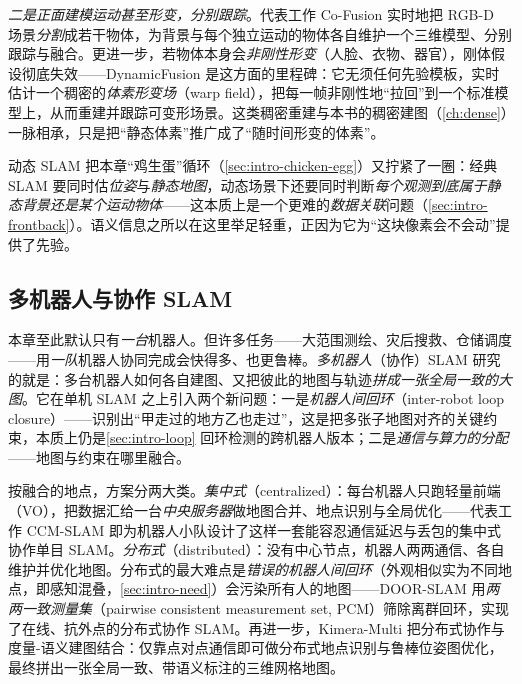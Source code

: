 \emph{二是正面建模运动甚至形变，分别跟踪}。代表工作 Co-Fusion\cite{runz2017cofusion} 实时地把 RGB-D 场景\emph{分割}成若干物体，为背景与每个独立运动的物体各自维护一个三维模型、分别跟踪与融合。更进一步，若物体本身会\emph{非刚性形变}（人脸、衣物、器官），刚体假设彻底失效——DynamicFusion\cite{newcombe2015dynamicfusion} 是这方面的里程碑：它无须任何先验模板，实时估计一个稠密的\emph{体素形变场}（warp field），把每一帧非刚性地“拉回”到一个标准模型上，从而重建并跟踪可变形场景。这类稠密重建与本书的稠密建图（\cref{ch:dense}）一脉相承，只是把“静态体素”推广成了“随时间形变的体素”。

\begin{insight}
动态 SLAM 把本章“鸡生蛋”循环（\cref{sec:intro-chicken-egg}）又拧紧了一圈：经典 SLAM 要同时估\emph{位姿}与\emph{静态地图}，动态场景下还要同时判断\emph{每个观测到底属于静态背景还是某个运动物体}——这本质上是一个更难的\emph{数据关联}问题（\cref{sec:intro-frontback}）。语义信息之所以在这里举足轻重，正因为它为“这块像素会不会动”提供了先验。
\end{insight}

\subsection{多机器人与协作 SLAM}
\label{sec:intro-multirobot}
本章至此默认只有\emph{一台}机器人。但许多任务——大范围测绘、灾后搜救、仓储调度——用\emph{一队}机器人协同完成会快得多、也更鲁棒。\emph{多机器人}（协作）SLAM 研究的就是：多台机器人如何各自建图、又把彼此的地图与轨迹\emph{拼成一张全局一致的大图}\cite{cadena2016past}。它在单机 SLAM 之上引入两个新问题：一是\emph{机器人间回环}（inter-robot loop closure）——识别出“甲走过的地方乙也走过”，这是把多张子地图对齐的关键约束，本质上仍是\cref{sec:intro-loop} 回环检测的跨机器人版本；二是\emph{通信与算力的分配}——地图与约束在哪里融合。

按融合的地点，方案分两大类。\emph{集中式}（centralized）：每台机器人只跑轻量前端（VO），把数据汇给一台\emph{中央服务器}做地图合并、地点识别与全局优化——代表工作 CCM-SLAM\cite{schmuck2019ccmslam} 即为机器人小队设计了这样一套能容忍通信延迟与丢包的集中式协作单目 SLAM。\emph{分布式}（distributed）：没有中心节点，机器人两两通信、各自维护并优化地图。分布式的最大难点是\emph{错误的机器人间回环}（外观相似实为不同地点，即感知混叠，\cref{sec:intro-need}）会污染所有人的地图——DOOR-SLAM\cite{lajoie2020doorslam} 用\emph{两两一致测量集}（pairwise consistent measurement set, PCM）筛除离群回环，实现了在线、抗外点的分布式协作 SLAM。再进一步，Kimera-Multi\cite{tian2022kimeramulti} 把分布式协作与度量-语义建图结合：仅靠点对点通信即可做分布式地点识别与鲁棒位姿图优化，最终拼出一张全局一致、带语义标注的三维网格地图。

